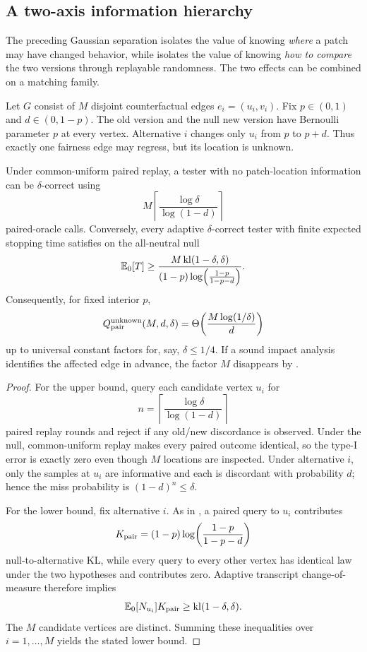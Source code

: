 \subsection{A two-axis information hierarchy}

The preceding Gaussian separation isolates the value of knowing \emph{where} a
patch may have changed behavior, while  isolates
the value of knowing \emph{how to compare} the two versions through replayable
randomness.  The two effects can be combined on a matching family.

Let \(G\) consist of \(M\) disjoint counterfactual edges
\(e_i=(u_i,v_i)\).  Fix \(p\in(0,1)\) and \(d\in(0,1-p)\).  The old version and
the null new version have Bernoulli parameter \(p\) at every vertex.  Alternative
\(i\) changes only \(u_i\) from \(p\) to \(p+d\).  Thus exactly one fairness edge
may regress, but its location is unknown.

\begin{corollary}
\label{cor:bernoulli-location}
Under common-uniform paired replay, a tester with no patch-location information
can be \(\delta\)-correct using
\[
M\left\lceil
\frac{\log\delta}{\log(1-d)}
\right\rceil
\]
paired-oracle calls.  Conversely, every adaptive \(\delta\)-correct tester with
finite expected stopping time satisfies on the all-neutral null
\[
\mathbb{E}_0[T]
\ge
\frac{M\,\mathrm{kl}(1-\delta,\delta)}
{(1-p)\log\!\left(\frac{1-p}{1-p-d}\right)}.
\]
Consequently, for fixed interior \(p\),
\[
Q_{\rm pair}^{\rm unknown}(M,d,\delta)
=
\Theta\!\left(
\frac{M\log(1/\delta)}{d}
\right)
\]
up to universal constant factors for, say, \(\delta\le 1/4\).
If a sound impact analysis identifies the affected edge in advance, the factor
\(M\) disappears by .
\end{corollary}

\begin{proof}
For the upper bound, query each candidate vertex \(u_i\) for
\[
n=\left\lceil\frac{\log\delta}{\log(1-d)}\right\rceil
\]
paired replay rounds and reject if any old/new discordance is observed.  Under the
null, common-uniform replay makes every paired outcome identical, so the type-I
error is exactly zero even though \(M\) locations are inspected.  Under
alternative \(i\), only the samples at \(u_i\) are informative and each is
discordant with probability \(d\); hence the miss probability is
\((1-d)^n\le\delta\).

For the lower bound, fix alternative \(i\).  As in
, a paired query to \(u_i\) contributes
\[
K_{\rm pair}
=
(1-p)\log\!\left(\frac{1-p}{1-p-d}\right)
\]
null-to-alternative KL, while every query to every other vertex has identical law
under the two hypotheses and contributes zero.  Adaptive transcript
change-of-measure therefore implies
\[
\mathbb{E}_0[N_{u_i}]K_{\rm pair}
\ge
\mathrm{kl}(1-\delta,\delta).
\]
The \(M\) candidate vertices are distinct.  Summing these inequalities over
\(i=1,\ldots,M\) yields the stated lower bound.
\end{proof}

